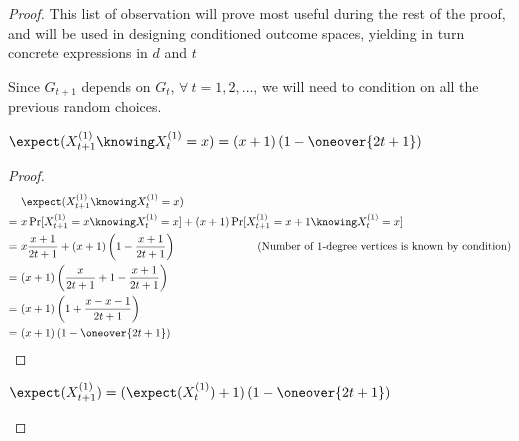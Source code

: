 \begin{proof}
    This list of observation will prove most useful during the rest of the proof, and will be used in designing conditioned outcome spaces, yielding in turn concrete expressions in $d$ and $t$

    \vbox{}
    

    \vbox{}
        
    Since $G_{t + 1}$ depends on $G_t$, $\forall\ t = 1,2,\ldots$, we will need to condition on all the previous random choices.

    \begin{lemma}\label{l:pref-att-1}
        $\displaystyle \expect(X_{t + 1}^{(1)} \knowing X_t^{(1)} = x) = (x + 1) \left( 1 - \oneover{2t + 1} \right)$
    \end{lemma}

    \begin{proof}
        \begin{align*}
             &\ \expect(X_{t + 1}^{(1)} \knowing X_t^{(1)} = x)                                 & \phantom{mmmmmmmmmm} \\
            =&\ x \Pr[X_{t + 1}^{(1)} = x \knowing X_t^{(1)} = x] + (x + 1) \Pr[X_{t + 1}^{(1)} = x + 1 \knowing X_t^{(1)} = x] & \\
            =&\ x \frac{x + 1}{2t + 1} + (x + 1) \left( 1 - \frac{x + 1}{2t + 1} \right)        & \mathllap{\text{(Number of 1-degree vertices is known by condition)}} \\
            =&\ (x + 1) \left( \frac{x}{2t + 1} + 1 - \frac{x + 1}{2t + 1} \right)              & \\
            =&\ (x + 1) \left( 1 + \frac{x - x - 1}{2t + 1} \right)                             & \\
            =&\ (x + 1) \left( 1 - \oneover{2t + 1} \right)                                     &
        \end{align*}
    \end{proof}

    \begin{lemma}\label{l:pref-att-2}
        $\displaystyle \expect(X_{t + 1}^{(1)}) = (\expect(X_t^{(1)}) + 1)  \left(1 - \oneover{2t + 1} \right)$
    \end{lemma}


\end{proof}
